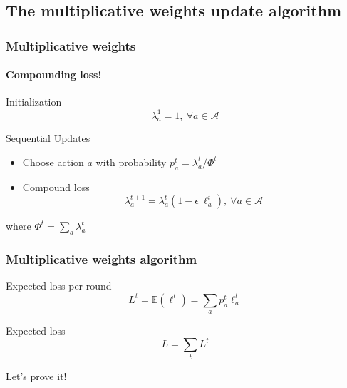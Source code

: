 \documentclass{beamer}
\begin{document}
\subsection{The multiplicative weights update algorithm}
\begin{frame}
    \frametitle{Multiplicative weights}
    \framesubtitle{Compounding loss!}

    \begin{block}{Initialization}
        \begin{equation*}
            \lambda_a^1 = 1,~\forall a\in\mathcal{A}
        \end{equation*}
    \end{block}

    \begin{block}{Sequential Updates}
        \begin{itemize}
            \item Choose action $a$ with probability $p_a^t = \lambda_a^t /
                \Phi^t$
            \item Compound loss
                \begin{equation*}
                    \lambda_a^{t+1} = \lambda_a^t (1 -
                    \epsilon~\ell_a^t),~\forall a\in\mathcal{A}
                \end{equation*}
        \end{itemize}
        where $\Phi^t = \sum_a \lambda_a^t$
    \end{block}

\end{frame}

\begin{frame}
    \frametitle{Multiplicative weights algorithm}

    \begin{block}{Expected loss per round}
        \begin{equation*}
            L^t = \mathbb{E}(\ell^t) = \sum_a p_a^t \ell_a^t
        \end{equation*}
    \end{block}

    \begin{block}{Expected loss}
        \begin{equation*}
            L = \sum_{t} L^t
        \end{equation*}
    \end{block}

    Let's prove it!

\end{frame}
\end{document}

